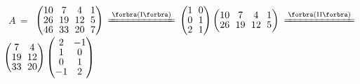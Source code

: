 \Example \,\,\,$A\,=\,$ {\normalsize$\begin{pmatrix} 10 &\hspace{-4pt} 7 &\hspace{-4pt} 4 &\hspace{-4pt} 1 \\[-2pt] 26 &\hspace{-4pt} 19 &\hspace{-4pt} 12 &\hspace{-4pt} 5\\[-2pt] 46 &\hspace{-4pt} 33 &\hspace{-4pt} 20 &\hspace{-4pt} 7\end{pmatrix}$
	{$\xlongequal{\SmallPar{\text{I}}}$}
	$\begin{pmatrix} 1 &\hspace{-4pt} 0\\[-2pt] 0 &\hspace{-4pt} 1\\[-2pt] 2 &\hspace{-4pt} 1\end{pmatrix}\begin{pmatrix} 10 &\hspace{-4pt} 7 &\hspace{-4pt} 4 &\hspace{-4pt} 1\\[-2pt] 26 &\hspace{-4pt} 19 &\hspace{-4pt} 12 &\hspace{-4pt} 5\end{pmatrix}$
	{$\xlongequal{\SmallPar{\text{II}}}$}
	$\begin{pmatrix} 7 &\hspace{-4pt} 4\\[-2pt] 19 &\hspace{-4pt} 12\\[-2pt] 33 &\hspace{-4pt} 20\end{pmatrix}\begin{pmatrix} 2 &\hspace{-4pt} -1\\[-2pt] 1 &\hspace{-4pt} 0\\[-2pt] 0 &\hspace{-4pt} 1\\[-2pt] -1 &\hspace{-4pt} 2\end{pmatrix}$}\par\quad
